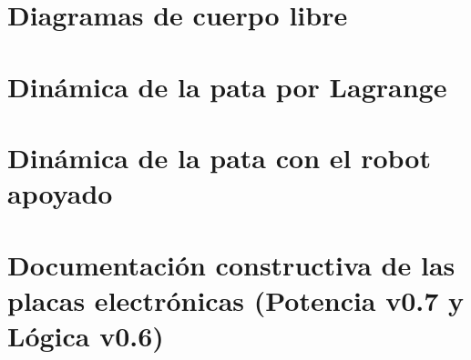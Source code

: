 \documentclass[11pt,a4paper]{report}
\begin{document}
\chapter{Diagramas de cuerpo libre}\label{ap:dcl}


\chapter{Dinámica de la pata por Lagrange}\label{ap:dinres}


\chapter{Dinámica de la pata con el robot apoyado}\label{ap:dinapo}


\chapter{Documentación constructiva de las placas electrónicas (Potencia v0.7 y Lógica v0.6)}\label{ap:pcb}

\end{document}
